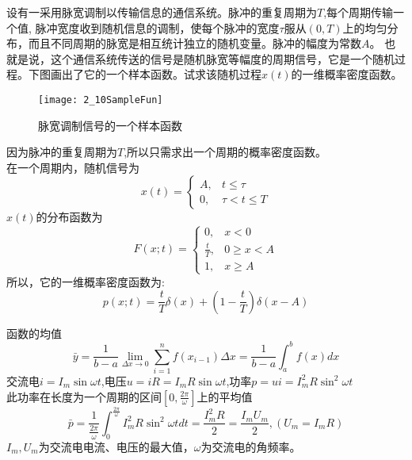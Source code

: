\begin{frame}
\begin{example}
设有一采用脉宽调制以传输信息的通信系统。脉冲的重复周期为$T$,每个周期传输一个值, 脉冲宽度收到随机信息的调制，使每个脉冲的宽度$\tau$服从$(0,T)$上的均匀分布，而且不同周期的脉宽是相互统计独立的随机变量。脉冲的幅度为常数$A$。 也就是说，这个通信系统传送的信号是随机脉宽等幅度的周期信号，它是一个随机过程。下图画出了它的一个样本函数。试求该随机过程$x(t)$的一维概率密度函数。
\begin{figure}
	\texttt{[image: 2\_10SampleFun]}
	\caption {脉宽调制信号的一个样本函数}
\end{figure}
\end{example}
\end{frame}

\begin{frame}
\begin{example}[解]
	因为脉冲的重复周期为$T$,所以只需求出一个周期的概率密度函数。\\
	在一个周期内，随机信号为
	\[
	x(t)=\begin{cases}
	A,&t\le\tau\\
	0,&\tau<t\le T
	\end{cases} 
	\]
	$x(t)$的分布函数为
	\[
	F(x;t)=\begin{cases}
	0,&x<0\\
	\frac{t}{T},&0\ge x<A\\
	1,&x\ge A
	\end{cases} 
	\]
	所以，它的一维概率密度函数为:
	\[p(x;t)=\frac{t}{T}\delta(x)+(1-\frac{t}{T})\delta(x-A) \]
\end{example}
\end{frame}


\begin{frame}
函数的均值
\[\bar{y}=\frac{1}{b-a}\lim\limits_{\Delta x\to 0}\sum\limits_{i=1}^{n}f(x_{i-1})\Delta x=\frac{1}{b-a}\int_{a}^{b}f(x)dx \]
交流电$i=I_m\sin\omega t$,电压$u=iR=I_mR\sin\omega t$,功率$p=ui=I_m^2R\sin^2\omega t$\\
此功率在长度为一个周期的区间$[0,\frac{2\pi}{\omega}]$上的平均值
\[\bar{p}=\frac{1}{\frac{2\pi}{\omega}}\int_{0}^{\frac{2\pi}{\omega}}I_m^2R\sin^2\omega tdt=\frac{I_m^2R}{2}=\frac{I_mU_m}{2},(U_m=I_mR) \]
$I_m,U_m$为交流电电流、电压的最大值，$\omega$为交流电的角频率。
\end{frame}


